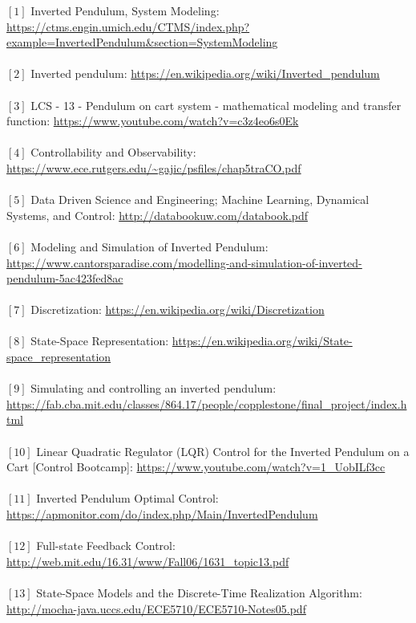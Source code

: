 \documentclass{article}
\begin{document}
\noindent $[1]$ Inverted Pendulum, System Modeling: \url{https://ctms.engin.umich.edu/CTMS/index.php?example=InvertedPendulum&section=SystemModeling}
\\
\vspace{1 mm} \\
$[2]$ Inverted pendulum: \url{https://en.wikipedia.org/wiki/Inverted_pendulum}
\\
\vspace{1 mm} \\
$[3]$ LCS - 13 - Pendulum on cart system - mathematical modeling and transfer function: \url{https://www.youtube.com/watch?v=c3z4eo6s0Ek}
\\
\vspace{1 mm} \\
$[4]$ Controllability and Observability: \url{https://www.ece.rutgers.edu/~gajic/psfiles/chap5traCO.pdf} \\
\\
$[5]$ Data Driven Science and Engineering; Machine Learning, Dynamical Systems, and Control: \url{http://databookuw.com/databook.pdf} \\
\\
$[6]$ Modeling and Simulation of Inverted Pendulum: \url{https://www.cantorsparadise.com/modelling-and-simulation-of-inverted-pendulum-5ac423fed8ac}
\\
\vspace{1 mm} \\
\noindent $[7]$ Discretization: \url{https://en.wikipedia.org/wiki/Discretization} \\
\vspace{1 mm} \\
$[8]$ State-Space Representation: \url{https://en.wikipedia.org/wiki/State-space_representation} \\
\vspace{1 mm} \\
$[9]$ Simulating and controlling an inverted pendulum: \url{https://fab.cba.mit.edu/classes/864.17/people/copplestone/final_project/index.html} \\
\vspace{1 mm} \\
$[10]$ Linear Quadratic Regulator (LQR) Control for the Inverted Pendulum on a Cart [Control Bootcamp]: \url{https://www.youtube.com/watch?v=1_UobILf3cc} \\
\vspace{1 mm} \\
\noindent $[11]$ Inverted Pendulum Optimal Control: \url{https://apmonitor.com/do/index.php/Main/InvertedPendulum} \\
\vspace{1 mm} \\
$[12]$ Full-state Feedback Control: \url{http://web.mit.edu/16.31/www/Fall06/1631_topic13.pdf} \\
\vspace{1 mm} \\
$[13]$ State-Space Models and the Discrete-Time Realization Algorithm: \url{http://mocha-java.uccs.edu/ECE5710/ECE5710-Notes05.pdf} \\
\end{document}
